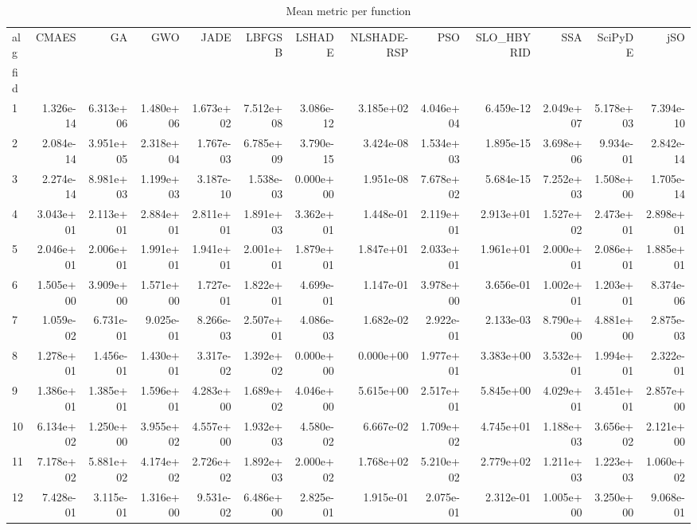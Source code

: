 \begin{table}
\caption{Mean metric per function}
\label{tab:mean_all}
\begin{tabular}{lrrrrrrrrrrrr}
\toprule
alg & CMAES & GA & GWO & JADE & LBFGSB & LSHADE & NLSHADE-RSP & PSO & SLO_HBYRID & SSA & SciPyDE & jSO \\
fid &  &  &  &  &  &  &  &  &  &  &  &  \\
\midrule
1 & 1.326e-14 & 6.313e+06 & 1.480e+06 & 1.673e+02 & 7.512e+08 & 3.086e-12 & 3.185e+02 & 4.046e+04 & 6.459e-12 & 2.049e+07 & 5.178e+03 & 7.394e-10 \\
2 & 2.084e-14 & 3.951e+05 & 2.318e+04 & 1.767e-03 & 6.785e+09 & 3.790e-15 & 3.424e-08 & 1.534e+03 & 1.895e-15 & 3.698e+06 & 9.934e-01 & 2.842e-14 \\
3 & 2.274e-14 & 8.981e+03 & 1.199e+03 & 3.187e-10 & 1.538e-03 & 0.000e+00 & 1.951e-08 & 7.678e+02 & 5.684e-15 & 7.252e+03 & 1.508e+00 & 1.705e-14 \\
4 & 3.043e+01 & 2.113e+01 & 2.884e+01 & 2.811e+01 & 1.891e+03 & 3.362e+01 & 1.448e-01 & 2.119e+01 & 2.913e+01 & 1.527e+02 & 2.473e+01 & 2.898e+01 \\
5 & 2.046e+01 & 2.006e+01 & 1.991e+01 & 1.941e+01 & 2.001e+01 & 1.879e+01 & 1.847e+01 & 2.033e+01 & 1.961e+01 & 2.000e+01 & 2.086e+01 & 1.885e+01 \\
6 & 1.505e+00 & 3.909e+00 & 1.571e+00 & 1.727e-01 & 1.822e+01 & 4.699e-01 & 1.147e-01 & 3.978e+00 & 3.656e-01 & 1.002e+01 & 1.203e+01 & 8.374e-06 \\
7 & 1.059e-02 & 6.731e-01 & 9.025e-01 & 8.266e-03 & 2.507e+01 & 4.086e-03 & 1.682e-02 & 2.922e-01 & 2.133e-03 & 8.790e+00 & 4.881e+00 & 2.875e-03 \\
8 & 1.278e+01 & 1.456e-01 & 1.430e+01 & 3.317e-02 & 1.392e+02 & 0.000e+00 & 0.000e+00 & 1.977e+01 & 3.383e+00 & 3.532e+01 & 1.994e+01 & 2.322e-01 \\
9 & 1.386e+01 & 1.385e+01 & 1.596e+01 & 4.283e+00 & 1.689e+02 & 4.046e+00 & 5.615e+00 & 2.517e+01 & 5.845e+00 & 4.029e+01 & 3.451e+01 & 2.857e+00 \\
10 & 6.134e+02 & 1.250e+00 & 3.955e+02 & 4.557e+00 & 1.932e+03 & 4.580e-02 & 6.667e-02 & 1.709e+02 & 4.745e+01 & 1.188e+03 & 3.656e+02 & 2.121e+00 \\
11 & 7.178e+02 & 5.881e+02 & 4.174e+02 & 2.726e+02 & 1.892e+03 & 2.000e+02 & 1.768e+02 & 5.210e+02 & 2.779e+02 & 1.211e+03 & 1.223e+03 & 1.060e+02 \\
12 & 7.428e-01 & 3.115e-01 & 1.316e+00 & 9.531e-02 & 6.486e+00 & 2.825e-01 & 1.915e-01 & 2.075e-01 & 2.312e-01 & 1.005e+00 & 3.250e+00 & 9.068e-01 \\

\end{tabular}
\end{table}
